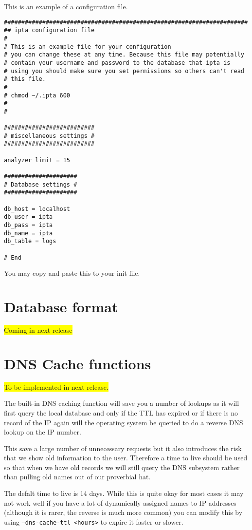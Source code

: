 \documentclass[english,twoside,openright,a4paper,12pt]{article}
\newcommand{\hilight}[1]{\colorbox{yellow}{#1}}
\begin{document}
This is an example of a configuration file.
\scriptsize
\begin{verbatim}
######################################################################
## ipta configuration file
#
# This is an example file for your configuration
# you can change these at any time. Because this file may potentially
# contain your username and password to the database that ipta is 
# using you should make sure you set permissions so others can't read
# this file.
#
# chmod ~/.ipta 600
#
#

##########################
# miscellaneous settings #
##########################

analyzer limit = 15

#####################
# Database settings #
#####################

db_host = localhost
db_user = ipta
db_pass = ipta
db_name = ipta
db_table = logs

# End
\end{verbatim}
\normalsize

You may copy and paste this to your init file.

\section{Database format}

\hilight{Coming in next release}

\section{DNS Cache functions}

\hilight{To be implemented in next release.}

The built-in DNS caching function will save you a number of lookups as
it will first query the local database and only if the TTL has expired
or if there is no record of the IP again will the operating system be
queried to do a reverse DNS lookup on the IP number.

This save a large number of unnecessary requests but it also
introduces the risk that we show old information to the user.
Therefore a time to live should be used so that when we have old
records we will still query the DNS subsystem rather than pulling old
names out of our proverbial hat.

The defalt time to live is 14 days. While this is quite okay for most
cases it may not work well if you have a lot of dynamically assigned
names to IP addresses (although it is rarer, the reverse is much more
common) you can modify this by using \texttt{--dns-cache-ttl <hours>}
to expire it faster or slower.
\end{document}
